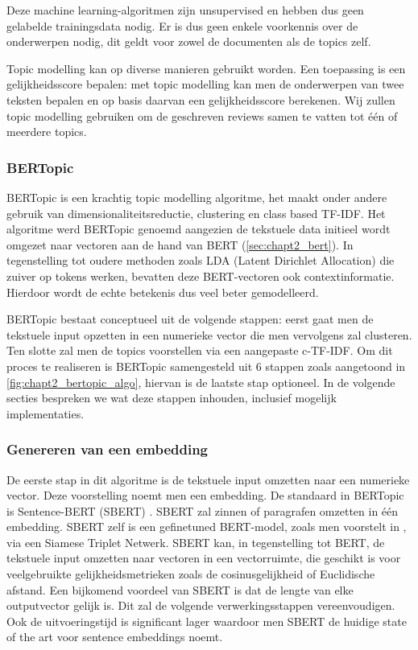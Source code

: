 Deze machine learning-algoritmen zijn unsupervised en hebben dus geen gelabelde trainingsdata nodig. Er is dus geen enkele voorkennis over de onderwerpen nodig, dit geldt voor zowel de documenten als de topics zelf. 

Topic modelling kan op diverse manieren gebruikt worden. Een toepassing is een gelijkheidsscore bepalen: met topic modelling kan men de onderwerpen van twee teksten bepalen en op basis daarvan een gelijkheidsscore berekenen. Wij zullen topic modelling gebruiken om de geschreven reviews samen te vatten tot één of meerdere topics.

\subsubsection{BERTopic}
\label{sub:chapt2_bertopic}

BERTopic \cite{bertopic_paper} is een krachtig topic modelling algoritme, het maakt onder andere gebruik van dimensionaliteitsreductie, clustering en class based TF-IDF. Het algoritme werd BERTopic genoemd aangezien de tekstuele data initieel wordt omgezet naar vectoren aan de hand van BERT (\ref{sec:chapt2_bert}). In tegenstelling tot oudere methoden zoals LDA (Latent Dirichlet Allocation) \cite{lda_paper} die zuiver op tokens werken, bevatten deze BERT-vectoren ook contextinformatie. Hierdoor wordt de echte betekenis dus veel beter gemodelleerd.


BERTopic bestaat conceptueel uit de volgende stappen: eerst gaat men de tekstuele input opzetten in een numerieke vector die men vervolgens zal clusteren. Ten slotte zal men de topics voorstellen via een aangepaste c-TF-IDF. Om dit proces te realiseren is BERTopic samengesteld uit 6 stappen zoals aangetoond in \autoref{fig:chapt2_bertopic_algo}, hiervan is de laatste stap optioneel. In de volgende secties bespreken we wat deze stappen inhouden, inclusief mogelijk implementaties.

\subsubsection{Genereren van een embedding}
\label{sub:chapt2_bertopic_embedding}
De eerste stap in dit algoritme is de tekstuele input omzetten naar een numerieke vector. Deze voorstelling noemt men een embedding. De standaard in BERTopic is Sentence-BERT (SBERT) \cite{sentence_bert}. SBERT zal zinnen of paragrafen omzetten in één embedding. SBERT zelf is een gefinetuned BERT-model, zoals men voorstelt in \cite{BERT_paper}, via een Siamese Triplet Netwerk. SBERT kan, in tegenstelling tot BERT, de tekstuele input omzetten naar vectoren in een vectorruimte, die geschikt is voor veelgebruikte gelijkheidsmetrieken zoals de cosinusgelijkheid of Euclidische afstand. \cite{sentence_bert}
Een bijkomend voordeel van SBERT is dat de lengte van elke outputvector gelijk is. Dit zal de volgende verwerkingsstappen vereenvoudigen. Ook de uitvoeringstijd is significant lager waardoor men SBERT de huidige state of the art voor sentence embeddings noemt.

